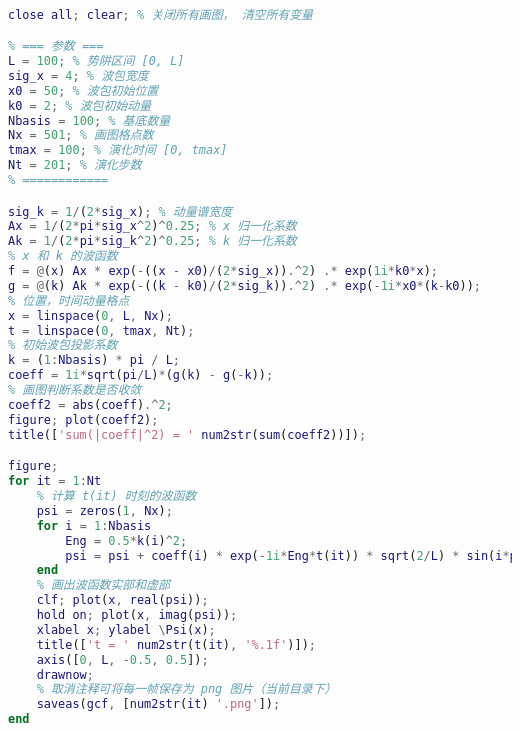 
\begin{issues}
\issueDraft
\end{issues}


\begin{lstlisting}[language=matlab, caption=WpkISW.m]
% 无限深势阱中的波包

close all; clear; % 关闭所有画图， 清空所有变量

% === 参数 ===
L = 100; % 势阱区间 [0, L]
sig_x = 4; % 波包宽度
x0 = 50; % 波包初始位置
k0 = 2; % 波包初始动量
Nbasis = 100; % 基底数量
Nx = 501; % 画图格点数
tmax = 100; % 演化时间 [0, tmax]
Nt = 201; % 演化步数
% ============

sig_k = 1/(2*sig_x); % 动量谱宽度
Ax = 1/(2*pi*sig_x^2)^0.25; % x 归一化系数
Ak = 1/(2*pi*sig_k^2)^0.25; % k 归一化系数
% x 和 k 的波函数
f = @(x) Ax * exp(-((x - x0)/(2*sig_x)).^2) .* exp(1i*k0*x);
g = @(k) Ak * exp(-((k - k0)/(2*sig_k)).^2) .* exp(-1i*x0*(k-k0));
% 位置，时间动量格点
x = linspace(0, L, Nx);
t = linspace(0, tmax, Nt);
% 初始波包投影系数
k = (1:Nbasis) * pi / L;
coeff = 1i*sqrt(pi/L)*(g(k) - g(-k));
% 画图判断系数是否收敛
coeff2 = abs(coeff).^2;
figure; plot(coeff2);
title(['sum(|coeff|^2) = ' num2str(sum(coeff2))]);

figure;
for it = 1:Nt
    % 计算 t(it) 时刻的波函数
    psi = zeros(1, Nx);
    for i = 1:Nbasis
        Eng = 0.5*k(i)^2;
        psi = psi + coeff(i) * exp(-1i*Eng*t(it)) * sqrt(2/L) * sin(i*pi*x/L);
    end
    % 画出波函数实部和虚部
    clf; plot(x, real(psi));
    hold on; plot(x, imag(psi));
    xlabel x; ylabel \Psi(x);
    title(['t = ' num2str(t(it), '%.1f')]);
    axis([0, L, -0.5, 0.5]);
    drawnow;
    % 取消注释可将每一帧保存为 png 图片（当前目录下）
    saveas(gcf, [num2str(it) '.png']);
end
\end{lstlisting}
